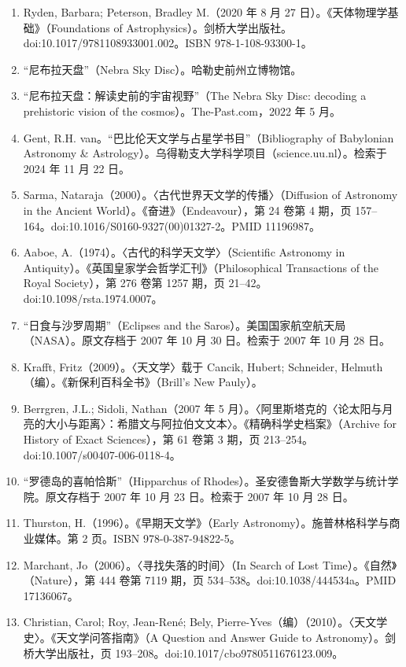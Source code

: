 \begin{enumerate}
  \item Ryden, Barbara; Peterson, Bradley M.（2020 年 8 月 27 日）。《天体物理学基础》（Foundations of Astrophysics）。剑桥大学出版社。doi:10.1017/9781108933001.002。ISBN 978-1-108-93300-1。
  \item “尼布拉天盘”（Nebra Sky Disc）。哈勒史前州立博物馆。
  \item “尼布拉天盘：解读史前的宇宙视野”（The Nebra Sky Disc: decoding a prehistoric vision of the cosmos）。The-Past.com，2022 年 5 月。
  \item Gent, R.H. van。“巴比伦天文学与占星学书目”（Bibliography of Babylonian Astronomy & Astrology）。乌得勒支大学科学项目（science.uu.nl）。检索于 2024 年 11 月 22 日。
  \item Sarma, Nataraja（2000）。〈古代世界天文学的传播〉（Diffusion of Astronomy in the Ancient World）。《奋进》（Endeavour），第 24 卷第 4 期，页 157–164。doi:10.1016/S0160-9327(00)01327-2。PMID 11196987。
  \item Aaboe, A.（1974）。〈古代的科学天文学〉（Scientific Astronomy in Antiquity）。《英国皇家学会哲学汇刊》（Philosophical Transactions of the Royal Society），第 276 卷第 1257 期，页 21–42。doi:10.1098/rsta.1974.0007。
  \item “日食与沙罗周期”（Eclipses and the Saros）。美国国家航空航天局（NASA）。原文存档于 2007 年 10 月 30 日。检索于 2007 年 10 月 28 日。
  \item Krafft, Fritz（2009）。〈天文学〉载于 Cancik, Hubert; Schneider, Helmuth（编）。《新保利百科全书》（Brill’s New Pauly）。
  \item Berrgren, J.L.; Sidoli, Nathan（2007 年 5 月）。〈阿里斯塔克的〈论太阳与月亮的大小与距离〉：希腊文与阿拉伯文文本〉。《精确科学史档案》（Archive for History of Exact Sciences），第 61 卷第 3 期，页 213–254。doi:10.1007/s00407-006-0118-4。
  \item “罗德岛的喜帕恰斯”（Hipparchus of Rhodes）。圣安德鲁斯大学数学与统计学院。原文存档于 2007 年 10 月 23 日。检索于 2007 年 10 月 28 日。
  \item Thurston, H.（1996）。《早期天文学》（Early Astronomy）。施普林格科学与商业媒体。第 2 页。ISBN 978-0-387-94822-5。
  \item Marchant, Jo（2006）。〈寻找失落的时间〉（In Search of Lost Time）。《自然》（Nature），第 444 卷第 7119 期，页 534–538。doi:10.1038/444534a。PMID 17136067。
  \item Christian, Carol; Roy, Jean-René; Bely, Pierre-Yves（编）（2010）。〈天文学史〉。《天文学问答指南》（A Question and Answer Guide to Astronomy）。剑桥大学出版社，页 193–208。doi:10.1017/cbo9780511676123.009。

\end{enumerate}
